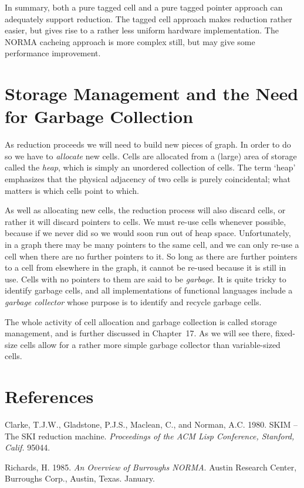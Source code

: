 In summary, both a pure tagged cell and a pure tagged pointer approach
can adequately support reduction. The tagged cell approach makes reduction
rather easier, but gives rise to a rather less uniform hardware implementation.
The NORMA cacheing approach is more complex still, but may give some
performance improvement.

\section{Storage Management and the Need for Garbage Collection}

As reduction proceeds we will need to build new pieces of graph. In order to
do so we have to \textit{allocate} new cells. Cells are allocated from a (large) area of
storage called the \textit{heap}, which is simply an unordered collection of cells. The
term `heap' emphasizes that the physical adjacency of two cells is purely
coincidental; what matters is which cells point to which.

As well as allocating new cells, the reduction process will also discard cells,
or rather it will discard pointers to cells. We must re-use cells whenever
possible, because if we never did so we would soon run out of heap space.
Unfortunately, in a graph there may be many pointers to the same cell, and we
can only re-use a cell when there are no further pointers to it. So long as there
are further pointers to a cell from elsewhere in the graph, it cannot be re-used
because it is still in use. Cells with no pointers to them are said to be \textit{garbage}.
It is quite tricky to identify garbage cells, and all implementations of
functional languages include a \textit{garbage collector} whose purpose is to identify
and recycle garbage cells.

The whole activity of cell allocation and garbage collection is called storage
management, and is further discussed in Chapter~17. As we will see there,
fixed-size cells allow for a rather more simple garbage collector than variable-sized cells.

\section*{References}

\begin{references}

    \item Clarke, T.J.W., Gladstone, P.J.S., Maclean, C., and Norman, A.C. 1980. SKIM --
    The SKI reduction machine. \textit{Proceedings of the ACM Lisp Conference, Stanford, Calif.} 95044.

    \item Richards, H. 1985. \textit{An Overview of Burroughs NORMA}. Austin Research Center,
    Burroughs Corp., Austin, Texas. January.

\end{references}